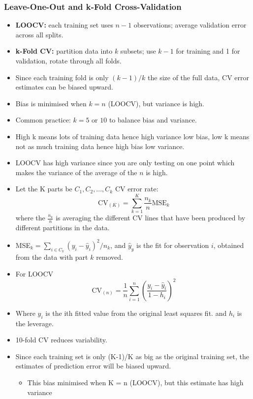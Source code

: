 \documentclass{article}
\begin{document}
\subsubsection{Leave-One-Out and k-Fold Cross-Validation}
\begin{itemize}
    \item \textbf{LOOCV:} each training set uses $n-1$ observations; average validation error across all splits.
    \item \textbf{k-Fold CV:} partition data into $k$ subsets; use $k-1$ for training and 1 for validation, rotate through all folds.
    \item Since each training fold is only $(k-1)/k$ the size of the full data, CV error estimates can be biased upward.
    \item Bias is minimised when $k=n$ (LOOCV), but variance is high.
    \item Common practice: $k=5$ or $10$ to balance bias and variance.
    \item High k means lots of training data hence high variance low bias, low k means not as much training data hence high bias low variance.
    \item LOOCV has high variance since you are only testing on one point which makes the variance of the average of the $n$ is high.
    \item Let the K parts be $C_1, C_2, ..., C_k$ CV error rate:
    \begin{equation*}
        \mathrm{CV}_{(K)} = \sum_{k=1}^K \frac{n_k}{n} \mathrm{MSE}_k
    \end{equation*}
    where the $\frac{n_k}{n}$ is averaging the different CV lines that have been produced by different partitions in the data.
    \item MSE$_k = \sum_{i\in C_k} (y_i - \hat{y}_i)^2 /n_k$, and $\hat{y}_y$ is the fit for observation $i$, obtained from the data with part $k$ removed.
    \item For LOOCV
    \begin{equation*}
        \mathrm{CV}_{(n)} = \frac{1}{n}\sum_{i=1}^n (\frac{y_i - \hat{y}_i}{1 - h_i})^2
    \end{equation*}
    \item Where $\hat{y}_i$ is the ith fitted value from the original least squares fit. and $h_i$ is the leverage.
    \item 10-fold CV reduces variability.
    \item Since each training set is only (K-1)/K as big as the original training set, the estimates of prediction error will be biased upward.
    \begin{itemize}
        \item This bias minimised when K = n (LOOCV), but this estimate has high variance
    \end{itemize}
\end{itemize}
\end{document}
